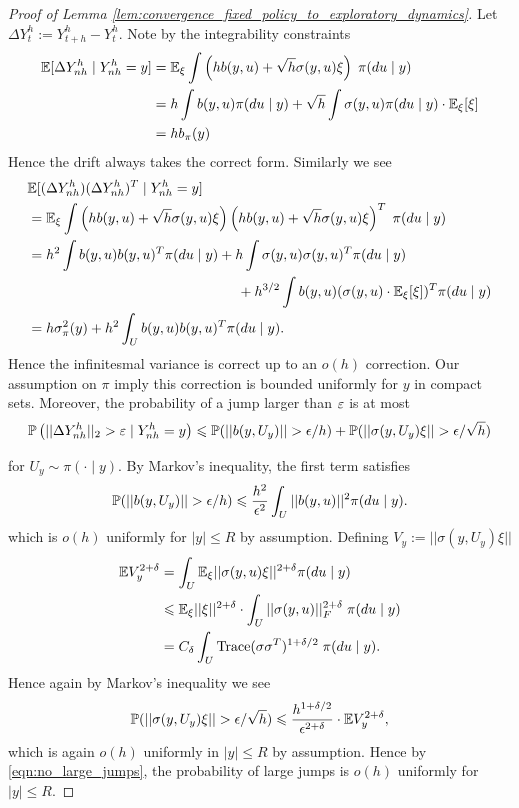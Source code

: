 \begin{proof}[Proof of Lemma \ref{lem:convergence_fixed_policy_to_exploratory_dynamics}]

	 Let $\Delta Y^h_t := Y^h_{t+h} - Y^h_t$. Note by the integrability constraints
	\begin{align*}
		\E [\Delta Y^h_{nh} \mid Y^h_{nh} = y]  & = \E_\xi \int \left(hb(y, u) + \sqrt{h} \sigma(y,u) \xi \right) \; \pi(du \mid y)\\
		& = h \int b(y,u) \pi(du \mid y) + \sqrt{h} \int \sigma(y,u) \pi(du \mid y) \cdot \E_\xi[\xi]\\
		& = h b_\pi(y)
	\end{align*}
	\noindent Hence the drift always takes the correct form. Similarly we see
	\begin{align*}
			& \E [(\Delta Y^h_{nh}) (\Delta Y^h_{nh})^T  \mid Y^h_{nh} = y] \\
			& = \E_\xi \int \left(hb(y,u) + \sqrt{h} \sigma(y,u) \xi \right) \left(hb(y,u) + \sqrt{h} \sigma(y,u) \xi \right)^T \; \pi(du \mid y) \\
				& = h^2 \int b(y,u) b(y,u)^T \pi(du \mid y) + h \int \sigma(y,u) \sigma(y,u)^T \pi(du \mid y) \\
				& \hspace{2.08in} + h^{3/2} \int b(y,u) (\sigma(y,u) \cdot \E_\xi[\xi])^T \pi(du \mid y)\\
			& =  h \sigma_\pi^2(y) + h^2 \int_U b(y,u) b(y,u)^T \pi(du \mid y).
	\end{align*}
	\noindent Hence the infinitesmal variance is correct up to an $o(h)$ correction. Our assumption on $\pi$ imply this correction is bounded uniformly for $y$ in compact sets.
	Moreover, the probability of a jump larger than $\eps$ is at most
	\begin{equation}
		\P\left(||\Delta Y^h_{nh}||_2 > \eps \mid Y^h_{nh} = y\right)  \leq \P(||b(y, U_y)|| > \epsilon / h) + \P(||\sigma(y, U_y) \xi|| > \epsilon / \sqrt{h})
		\label{eqn:no_large_jumps}
	\end{equation}

	\noindent for $U_y \sim \pi(\cdot \mid y)$. By Markov's inequality, the first term satisfies
		\[\P(||b(y, U_y)|| > \epsilon / h) \leq \frac{h^2}{\epsilon^2} \int_U ||b(y,u)||^2 \pi(du \mid y).\]
	\noindent which is $o(h)$ uniformly for $|y| \leq R$ by assumption. Defining $V_y := ||\sigma(y, U_y) \xi||$
	\begin{align*}
		\E V_y^{2+\delta} & = \int_U \E_\xi ||\sigma(y,u) \xi ||^{2+\delta} \pi(du \mid y)\\
		 & \leq \E_\xi ||\xi||^{2+\delta} \cdot \int_U  ||\sigma(y,u)||_F^{2+\delta} \;  \pi(du \mid y)\\
		 & = C_\delta \int_U \mathrm{Trace}(\sigma \sigma^T)^{1+\delta/2} \;  \pi(du \mid y).
	\end{align*}
	\noindent Hence again by Markov's inequality we see
	\[ \P(||\sigma(y, U_y) \xi|| > \epsilon / \sqrt{h}) \leq \frac{h^{1+\delta/2}}{\epsilon^{2+\delta}} \cdot \E V_y^{2+\delta},\]
	\noindent which is again $o(h)$ uniformly in $|y| \leq R$ by assumption. Hence by \eqref{eqn:no_large_jumps}, the probability of large
	jumps is $o(h)$ uniformly for $|y| \leq R$.


\end{proof}
